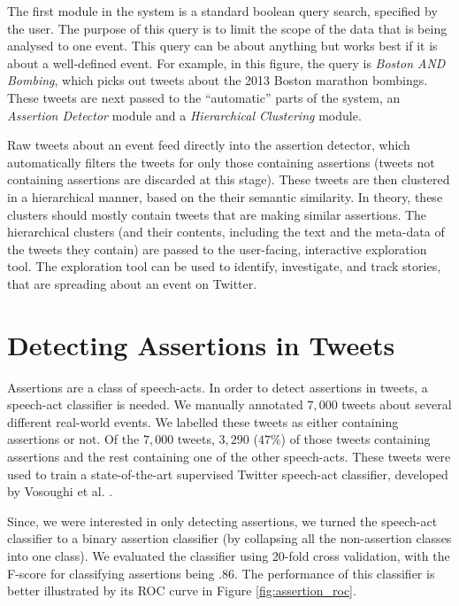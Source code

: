 \documentclass[letterpaper]{article}
\begin{document}
The first module in the system is a standard boolean query search, specified by the user. The purpose of this query is to limit the scope of the data that is being analysed to one event. This query can be about anything but works best if it is about a well-defined event. For example, in this figure, the query is \emph{Boston AND Bombing}, which picks out tweets about the 2013 Boston marathon bombings. These tweets are next passed to the ``automatic'' parts of the system, an \emph{Assertion Detector} module and a \emph{Hierarchical Clustering} module.

Raw tweets about an event feed directly into the assertion detector, which automatically filters the tweets for only those containing assertions (tweets not containing assertions are discarded at this stage). These tweets are then clustered in a hierarchical manner, based on the their semantic similarity. In theory, these clusters should mostly contain tweets that are making similar assertions. The hierarchical clusters (and their contents, including the text and the meta-data of the tweets they contain) are passed to the user-facing, interactive exploration tool. The exploration tool can be used to identify, investigate, and track stories, that are spreading about an event on Twitter.



\section{Detecting Assertions in Tweets}
Assertions are a class of speech-acts. In order to detect assertions in tweets, a speech-act classifier is needed. We manually annotated $7,000$ tweets about several different real-world events. We labelled these tweets as either containing assertions or not. Of the $7,000$ tweets, $3,290$ ($47\%$) of those tweets containing assertions and the rest containing one of the other speech-acts. These tweets were used to train a state-of-the-art supervised Twitter speech-act classifier, developed by Vosoughi et al. \cite{vosoughi_act_2016}. %

Since, we were interested in only detecting assertions, we turned the speech-act classifier to a binary assertion classifier (by collapsing all the non-assertion classes into one class). We evaluated the classifier using 20-fold cross validation, with the F-score for classifying assertions being $.86$. The performance of this classifier is better illustrated by its ROC curve in Figure \ref{fig:assertion_roc}.
\end{document}
